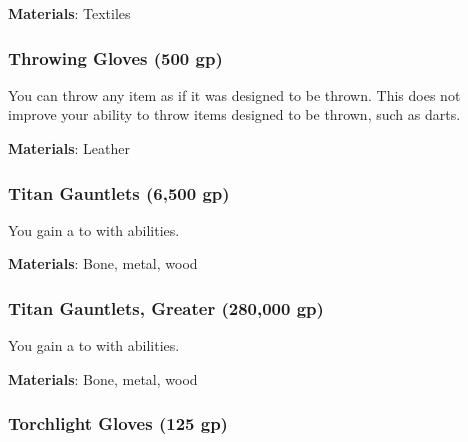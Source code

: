 \vspace{0.25em}
\textbf{Materials}: Textiles


\lowercase{\hypertarget{item:Throwing Gloves}{}}\label{item:Throwing Gloves}
\hypertarget{item:Throwing Gloves}{\subsubsection{Throwing Gloves\hfill{} (500 gp)}}

You can throw any item as if it was designed to be thrown.
This does not improve your ability to throw items designed to be thrown, such as darts.



\vspace{0.25em}
\textbf{Materials}: Leather


\lowercase{\hypertarget{item:Titan Gauntlets}{}}\label{item:Titan Gauntlets}
\hypertarget{item:Titan Gauntlets}{\subsubsection{Titan Gauntlets\hfill{} (6,500 gp)}}

You gain a   to  with  abilities.



\vspace{0.25em}
\textbf{Materials}: Bone, metal, wood


\lowercase{\hypertarget{item:Titan Gauntlets, Greater}{}}\label{item:Titan Gauntlets, Greater}
\hypertarget{item:Titan Gauntlets, Greater}{\subsubsection{Titan Gauntlets, Greater\hfill{} (280,000 gp)}}

You gain a   to  with  abilities.



\vspace{0.25em}
\textbf{Materials}: Bone, metal, wood


\lowercase{\hypertarget{item:Torchlight Gloves}{}}\label{item:Torchlight Gloves}
\hypertarget{item:Torchlight Gloves}{\subsubsection{Torchlight Gloves\hfill{} (125 gp)}}

